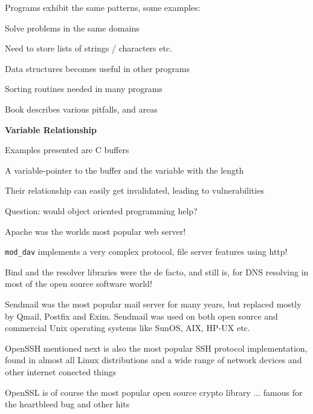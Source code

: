 \documentclass[Screen16to9,17pt]{foils}
\begin{document}


\begin{list2}
\item Programs exhibit the same patterns, some examples:
\item Solve problems in the same domains
\item Need to store lists of strings / characters etc.
\item Data structures becomes useful in other programs
\item Sorting routines needed in many programs
\end{list2}







\begin{list2}
\item Book describes various pitfalls, and areas
\item {\bf Variable Relationship}
\item Examples presented are C buffers
\item A variable-pointer to the buffer and the variable with the length
\item Their relationship can easily get invalidated, leading to vulnerabilities
\item Question: would object oriented programming help?
\end{list2}





\begin{list2}
\item Apache was the worlds most popular web server!
\item \verb+mod_dav+ implements a very complex protocol, file server features using http!
\item Bind and the resolver libraries were the de facto, and still is, for DNS resolving in most of the open source software world!
\item Sendmail was the most popular mail server for many years, but replaced mostly by Qmail, Postfix and Exim. Sendmail was used on both open source and commercial Unix operating systems like SunOS, AIX, HP-UX etc.
\item OpenSSH mentioned next is also the most popular SSH protocol implementation, found in almost all Linux distributions and a wide range of network devices and other internet conected things
\item OpenSSL is of course the most popular open source crypto library ... famous for the heartbleed bug and other hits
\end{list2}
\end{document}
